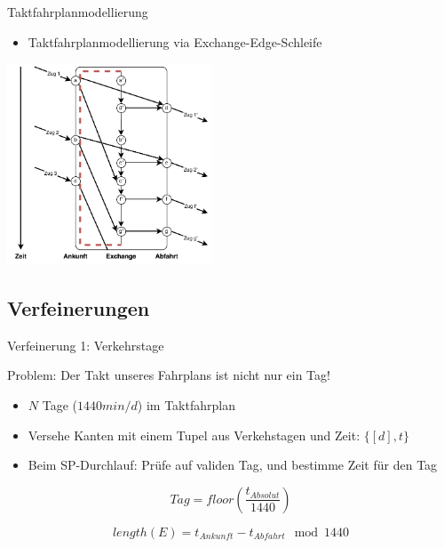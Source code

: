 \begin{frame}{Taktfahrplanmodellierung}
	\begin{itemize}
		\item Taktfahrplanmodellierung via Exchange-Edge-Schleife
	\end{itemize}

	\begin{center}
		\includegraphics[height=6cm]{images/time_expanded_constant_interchange_4.pdf} 
	\end{center}
\end{frame}


\subsection{Verfeinerungen}
\begin{frame}{Verfeinerung 1: Verkehrstage}
	\begin{block}{}
		Problem: Der Takt unseres Fahrplans ist nicht nur ein Tag!
	\end{block}
	\pause
	\begin{itemize}
		\item $N$ Tage ($1440min/d$) im Taktfahrplan
		\pause
		\item Versehe Kanten mit einem Tupel aus Verkehstagen und Zeit: $\{[d], t\}$
		\item Beim SP-Durchlauf: Prüfe auf validen Tag, und bestimme Zeit für den Tag
	\end{itemize}

	\pause
	\begin{equation*}
		Tag = floor(\frac{t_{Absolut}}{1440})
	\end{equation*}

	\pause
	\begin{equation*}
		length(E) = t_{Ankunft} - t_{Abfahrt} \mod 1440
	\end{equation*}
\end{frame}


